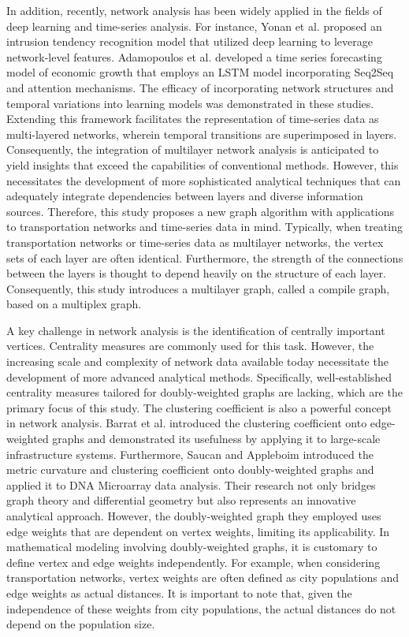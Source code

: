 \documentclass[preprint,12pt,number]{elsarticle}
\theoremstyle{plain} %
\theoremstyle{definition} %
\begin{document}
In addition, recently, network analysis has been widely applied in the fields of deep learning and time-series analysis. For instance, Yonan et al. \cite{Yonan} proposed an intrusion tendency recognition model that utilized deep learning to leverage network-level features. Adamopoulos et al. \cite{Adamopoulos} developed a time series forecasting model of economic growth that employs an LSTM model incorporating Seq2Seq and attention mechanisms. The efficacy of incorporating network structures and temporal variations into learning models was demonstrated in these studies. Extending this framework facilitates the representation of time-series data as multi-layered networks, wherein temporal transitions are superimposed in layers. Consequently, the integration of multilayer network analysis is anticipated to yield insights that exceed the capabilities of conventional methods. However, this necessitates the development of more sophisticated analytical techniques that can adequately integrate dependencies between layers and diverse information sources.
Therefore, this study proposes a new graph algorithm with applications to transportation networks and time-series data in mind. Typically, when treating transportation networks or time-series data as multilayer networks, the vertex sets of each layer are often identical. Furthermore, the strength of the connections between the layers is thought to depend heavily on the structure of each layer. Consequently, this study introduces a multilayer graph, called a compile graph, based on a multiplex graph.

A key challenge in network analysis is the identification of centrally important vertices. Centrality measures are commonly used for this task. However, the increasing scale and complexity of network data available today necessitate the development of more advanced analytical methods. Specifically, well-established centrality measures tailored for doubly-weighted graphs are lacking, which are the primary focus of this study.
The clustering coefficient is also a powerful concept in network analysis. 
Barrat et al. \cite{Barrat} introduced the clustering coefficient onto edge-weighted graphs and demonstrated its usefulness by applying it to large-scale infrastructure systems. Furthermore, Saucan and Appleboim \cite{CBCforDNA} introduced the metric curvature and clustering coefficient onto doubly-weighted graphs and applied it to DNA Microarray data analysis. Their research not only bridges graph theory and differential geometry but also represents an innovative analytical approach. However, the doubly-weighted graph they employed uses edge weights that are dependent on vertex weights, limiting its applicability. In mathematical modeling involving doubly-weighted graphs, it is customary to define vertex and edge weights independently. For example, when considering transportation networks, vertex weights are often defined as city populations and edge weights as actual distances. It is important to note that, given the independence of these weights from city populations, the actual distances do not depend on the population size.
\end{document}
